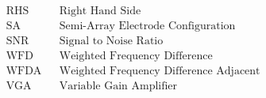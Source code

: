 \pagebreak
\begin{align*}
	&\text{RHS} &&\text{Right Hand Side}\\
	&\text{SA} &&\text{Semi-Array Electrode Configuration}\\
	&\text{SNR} &&\text{Signal to Noise Ratio}\\
	&\text{WFD} &&\text{Weighted Frequency Difference}\\
	&\text{WFDA} &&\text{Weighted Frequency Difference Adjacent}\\
	&\text{VGA} &&\text{Variable Gain Amplifier}\\
\end{align*}

